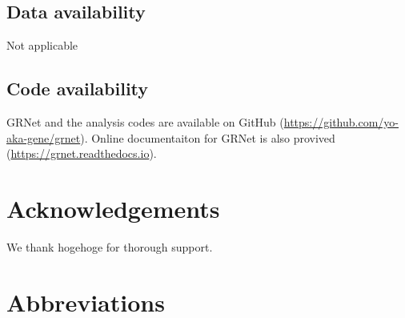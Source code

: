 \documentclass{article}
\begin{document}
\subsection*{Data availability}
Not applicable
\subsection*{Code availability}
GRNet and the analysis codes are available on GitHub (\url{https://github.com/yo-aka-gene/grnet}).
Online documentaiton for GRNet is also provived (\url{https://grnet.readthedocs.io}).



\section*{Acknowledgements}
We thank hogehoge for thorough support.


\section*{Abbreviations}
\printacronyms[heading=Abbreviations]



\end{document}
